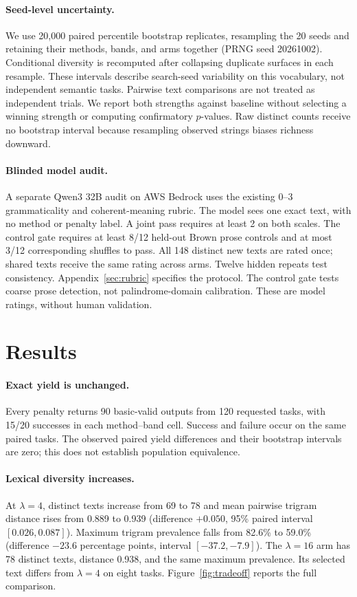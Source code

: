 \documentclass[11pt]{article}
\begin{document}
\paragraph{Seed-level uncertainty.}
We use 20,000 paired percentile bootstrap replicates, resampling the 20 seeds and retaining their methods, bands, and arms together (PRNG seed 20261002). Conditional diversity is recomputed after collapsing duplicate surfaces in each resample. These intervals describe search-seed variability on this vocabulary, not independent semantic tasks. Pairwise text comparisons are not treated as independent trials. We report both strengths against baseline without selecting a winning strength or computing confirmatory $p$-values. Raw distinct counts receive no bootstrap interval because resampling observed strings biases richness downward.

\paragraph{Blinded model audit.}
A separate Qwen3 32B audit on AWS Bedrock \citep{awsbedrockqwen332b} uses the existing 0--3 grammaticality and coherent-meaning rubric. The model sees one exact text, with no method or penalty label. A joint pass requires at least 2 on both scales. The control gate requires at least 8/12 held-out Brown prose controls \citep{kucera-francis-1967} and at most 3/12 corresponding shuffles to pass. All 148 distinct new texts are rated once; shared texts receive the same rating across arms. Twelve hidden repeats test consistency. Appendix~\ref{sec:rubric} specifies the protocol. The control gate tests coarse prose detection, not palindrome-domain calibration. These are model ratings, without human validation.

\section{Results}
\paragraph{Exact yield is unchanged.}
Every penalty returns 90 basic-valid outputs from 120 requested tasks, with 15/20 successes in each method--band cell. Success and failure occur on the same paired tasks. The observed paired yield differences and their bootstrap intervals are zero; this does not establish population equivalence.

\paragraph{Lexical diversity increases.}
At $\lambda=4$, distinct texts increase from 69 to 78 and mean pairwise trigram distance rises from 0.889 to 0.939 (difference $+0.050$, 95\% paired interval $[0.026,0.087]$). Maximum trigram prevalence falls from 82.6\% to 59.0\% (difference $-23.6$ percentage points, interval $[-37.2,-7.9]$). The $\lambda=16$ arm has 78 distinct texts, distance 0.938, and the same maximum prevalence. Its selected text differs from $\lambda=4$ on eight tasks. Figure~\ref{fig:tradeoff} reports the full comparison.
\end{document}
